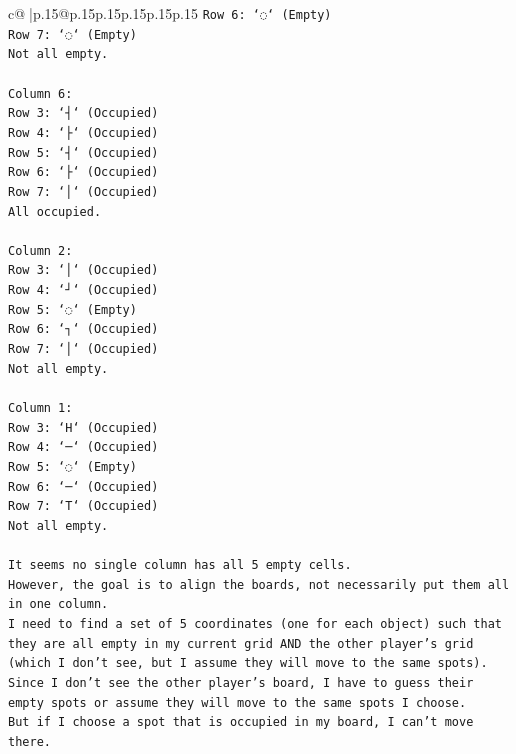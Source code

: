 \documentclass{article}
\begin{document}
{\begin{supertabular}{c@{$\;$}|p{.15\linewidth}@{}p{.15\linewidth}p{.15\linewidth}p{.15\linewidth}p{.15\linewidth}p{.15\linewidth}}
{{{\texttt{Row 6: `◌` (Empty)} \\
\texttt{Row 7: `◌` (Empty)} \\
\texttt{Not all empty.} \\
\\ 
\texttt{Column 6:} \\
\texttt{Row 3: `┤` (Occupied)} \\
\texttt{Row 4: `├` (Occupied)} \\
\texttt{Row 5: `┤` (Occupied)} \\
\texttt{Row 6: `├` (Occupied)} \\
\texttt{Row 7: `│` (Occupied)} \\
\texttt{All occupied.} \\
\\ 
\texttt{Column 2:} \\
\texttt{Row 3: `│` (Occupied)} \\
\texttt{Row 4: `┘` (Occupied)} \\
\texttt{Row 5: `◌` (Empty)} \\
\texttt{Row 6: `┐` (Occupied)} \\
\texttt{Row 7: `│` (Occupied)} \\
\texttt{Not all empty.} \\
\\ 
\texttt{Column 1:} \\
\texttt{Row 3: `H` (Occupied)} \\
\texttt{Row 4: `─` (Occupied)} \\
\texttt{Row 5: `◌` (Empty)} \\
\texttt{Row 6: `─` (Occupied)} \\
\texttt{Row 7: `T` (Occupied)} \\
\texttt{Not all empty.} \\
\\ 
\texttt{It seems no single column has all 5 empty cells.} \\
\texttt{However, the goal is to align the boards, not necessarily put them all in one column.} \\
\texttt{I need to find a set of 5 coordinates (one for each object) such that they are all empty in my current grid AND the other player's grid (which I don't see, but I assume they will move to the same spots).} \\
\texttt{Since I don't see the other player's board, I have to guess their empty spots or assume they will move to the same spots I choose.} \\
\texttt{But if I choose a spot that is occupied in my board, I can't move there.} \\
}}}
\end{supertabular}}
\end{document}
